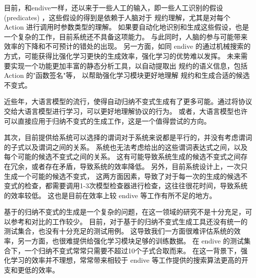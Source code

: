 目前，和endive一样，\rltla 还以来于一些人工的输入，即一些人工识别的假设(predicates)
，这些假设的得到是依赖于人脑对于 \TLA 规约理解，尤其是对每个 Action 进行调用时参数类型的理解。
如果要自动化地识别和生成这些假设，也是一个复杂的工作，目前系统还不具备这项能力。
与此同时，人脑的参与可能带来效率的下降和不可预计的错处的出现。
另一方面，如同 endive 的通过机械搜索的方式，可能获得比强化学习更快的生成效率，强化学习的优势难以发挥。
未来需要实现一个功能更加丰富的静态分析工具，以自动提取出 \TLA 规约的语义信息，包括 Action 的"函数签名"等，
以帮助强化学习模块更好地理解 \TLA 规约和生成合适的候选不变式。

近些年，大语言模型的流行，使得自动归纳不变式生成有了更多可能。通过将协议交给大语言模型进行学习，可以更好地理解协议的行为。
或者，大语言模型也许可以直接应用于归纳不变式的生成工作，这是一个值得尝试的方向。

其次，目前提供给系统可以选择的谓词对于系统来说都是平行的，并没有考虑谓词的子式以及谓词之间的关系。
系统也无法考虑给出的这些谓词表达式之间，以及每个可能的候选不变式之间的关系。
这有可能导致系统生成的候选不变式之间存在冗余，或者存在矛盾，导致系统的效率降低。
另外，目前系统设计上，一次只生成一个可能的候选不变式，
这两方面因素，导致了对于每一次的生成的候选不变式的检查，都需要调用1-3次模型检查器进行检查，这往往很花时间，导致系统的效率较低。
这也是目前在效率上较 endive 等工作有所不足的地方。

基于\TLA 的归纳不变式的生成是一个复杂的问题，在这一领域的研究不是十分充足，可以参考和对比的工作较少。
目前，对于基于\TLA 的归纳不变式生成工具还没有统一的测试集合，也没有十分充足的测试用例。
这导致我们一方面很难评估系统的效率，另一方面，也很难提供给强化学习模块足够的训练数据。
在 endive 的测试集合下，一个归纳不变式常常只需要不超过10个子式合取而来。
在这一背景下，强化学习的效率并不理想，常常带来相较于 endive 等工作提供的搜索算法更高的开支和更低的效率。

